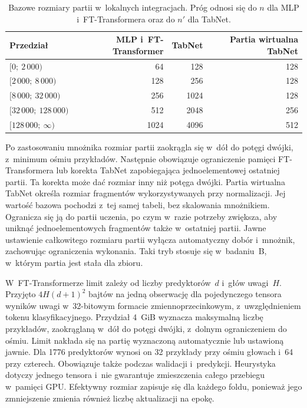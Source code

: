 \begin{table}[!htbp]
\centering\small
\caption{Bazowe rozmiary partii w~lokalnych integracjach. Próg odnosi się do $n$ dla MLP i~FT-Transformera oraz do $n'$ dla TabNet.}
\label{tab:dobor-partii}
\begin{tabular}{@{}lrrr@{}}
\toprule
Przedział & MLP i~FT-Transformer & TabNet & Partia wirtualna TabNet \\
\midrule
$[0;\ 2\,000)$ & 64 & 128 & 128 \\
$[2\,000;\ 8\,000)$ & 128 & 256 & 128 \\
$[8\,000;\ 32\,000)$ & 256 & 1024 & 128 \\
$[32\,000;\ 128\,000)$ & 512 & 2048 & 256 \\
$[128\,000;\ \infty)$ & 1024 & 4096 & 512 \\
\bottomrule
\end{tabular}
\end{table}

Po zastosowaniu mnożnika rozmiar partii zaokrągla się w~dół do potęgi dwójki, z~minimum ośmiu przykładów. Następnie obowiązuje ograniczenie pamięci FT-Transformera lub korekta TabNet zapobiegająca jednoelementowej ostatniej partii. Ta korekta może dać rozmiar inny niż potęga dwójki. Partia wirtualna TabNet określa rozmiar fragmentów wykorzystywanych przy normalizacji. Jej wartość bazowa pochodzi z~tej samej tabeli, bez skalowania mnożnikiem. Ogranicza się ją do partii uczenia, po czym w~razie potrzeby zwiększa, aby uniknąć jednoelementowych fragmentów także w~ostatniej partii. Jawne ustawienie całkowitego rozmiaru partii wyłącza automatyczny dobór i~mnożnik, zachowując ograniczenia wykonania. Taki tryb stosuje się w~badaniu~B, w~którym partia jest stała dla zbioru.

W~FT-Transformerze limit zależy od liczby predyktorów~$d$ i~głów uwagi~$H$. Przyjęto $4H(d+1)^2$ bajtów na jedną obserwację dla pojedynczego tensora wyników uwagi w~32-bitowym formacie zmiennoprzecinkowym, z~uwzględnieniem tokenu klasyfikacyjnego. Przydział 4~GiB wyznacza maksymalną liczbę przykładów, zaokrąglaną w~dół do potęgi dwójki, z~dolnym ograniczeniem do ośmiu. Limit nakłada się na partię wyznaczoną automatycznie lub ustawioną jawnie. Dla 1776 predyktorów wynosi on 32 przykłady przy ośmiu głowach i~64 przy czterech. Obowiązuje także podczas walidacji i~predykcji. Heurystyka dotyczy jednego tensora i~nie gwarantuje zmieszczenia całego przebiegu w~pamięci GPU. Efektywny rozmiar zapisuje się dla każdego foldu, ponieważ jego zmniejszenie zmienia również liczbę aktualizacji na epokę.

